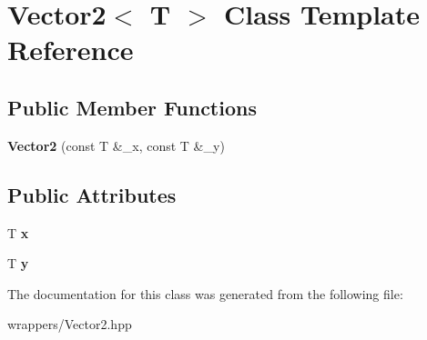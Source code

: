 \hypertarget{class_vector2}{}\section{Vector2$<$ T $>$ Class Template Reference}
\label{class_vector2}
\subsection*{Public Member Functions}
\begin{DoxyCompactItemize}
\item 
\mbox{\label{class_vector2_ab8cf9f67f03bae6dbc56de251fcbee28}} 
{\bfseries Vector2} (const T \&\+\_\+x, const T \&\+\_\+y)
\end{DoxyCompactItemize}
\subsection*{Public Attributes}
\begin{DoxyCompactItemize}
\item 
\mbox{\label{class_vector2_a78fa1f2ed5e261c7fbeb8f3536a1ee34}} 
T {\bfseries x}
\item 
\mbox{\label{class_vector2_a6cfed8355591aa269f4dba43bd806ef9}} 
T {\bfseries y}
\end{DoxyCompactItemize}


The documentation for this class was generated from the following file\+:\begin{DoxyCompactItemize}
\item 
wrappers/Vector2.\+hpp\end{DoxyCompactItemize}
